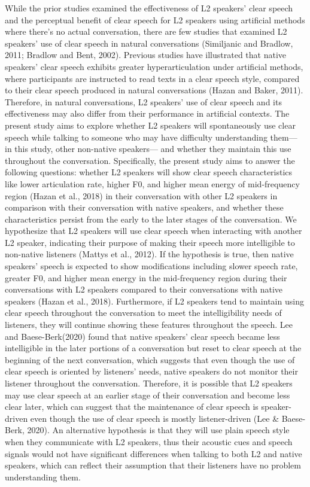 \documentclass[
  man,
  floatsintext,
  longtable,
  nolmodern,
  notxfonts,
  notimes,
  colorlinks=true,linkcolor=blue,citecolor=blue,urlcolor=blue]{apa7}
\begin{document}
While the prior studies examined the effectiveness of L2 speakers' clear
speech and the perceptual benefit of clear speech for L2 speakers using
artificial methods where there's no actual conversation, there are few
studies that examined L2 speakers' use of clear speech in natural
conversations (Similjanic and Bradlow, 2011; Bradlow and Bent, 2002).
Previous studies have illustrated that native speakers' clear speech
exhibits greater hyperarticulation under artificial methods, where
participants are instructed to read texts in a clear speech style,
compared to their clear speech produced in natural conversations (Hazan
and Baker, 2011). Therefore, in natural conversations, L2 speakers' use
of clear speech and its effectiveness may also differ from their
performance in artificial contexts. The present study aims to explore
whether L2 speakers will spontaneously use clear speech while talking to
someone who may have difficulty understanding them--- in this study,
other non-native speakers--- and whether they maintain this use
throughout the conversation. Specifically, the present study aims to
answer the following questions: whether L2 speakers will show clear
speech characteristics like lower articulation rate, higher F0, and
higher mean energy of mid-frequency region (Hazan et al., 2018) in their
conversation with other L2 speakers in comparison with their
conversation with native speakers, and whether these characteristics
persist from the early to the later stages of the conversation. We
hypothesize that L2 speakers will use clear speech when interacting with
another L2 speaker, indicating their purpose of making their speech more
intelligible to non-native listeners (Mattys et al., 2012). If the
hypothesis is true, then native speakers' speech is expected to show
modifications including slower speech rate, greater F0, and higher mean
energy in the mid-frequency region during their conversations with L2
speakers compared to their conversations with native speakers (Hazan et
al., 2018). Furthermore, if L2 speakers tend to maintain using clear
speech throughout the conversation to meet the intelligibility needs of
listeners, they will continue showing these features throughout the
speech. Lee and Baese-Berk(2020) found that native speakers' clear
speech became less intelligible in the later portions of a conversation
but reset to clear speech at the beginning of the next conversation,
which suggests that even though the use of clear speech is oriented by
listeners' needs, native speakers do not monitor their listener
throughout the conversation. Therefore, it is possible that L2 speakers
may use clear speech at an earlier stage of their conversation and
become less clear later, which can suggest that the maintenance of clear
speech is speaker-driven even though the use of clear speech is mostly
listener-driven (Lee \& Baese-Berk, 2020). An alternative hypothesis is
that they will use plain speech style when they communicate with L2
speakers, thus their acoustic cues and speech signals would not have
significant differences when talking to both L2 and native speakers,
which can reflect their assumption that their listeners have no problem
understanding them.
\end{document}
